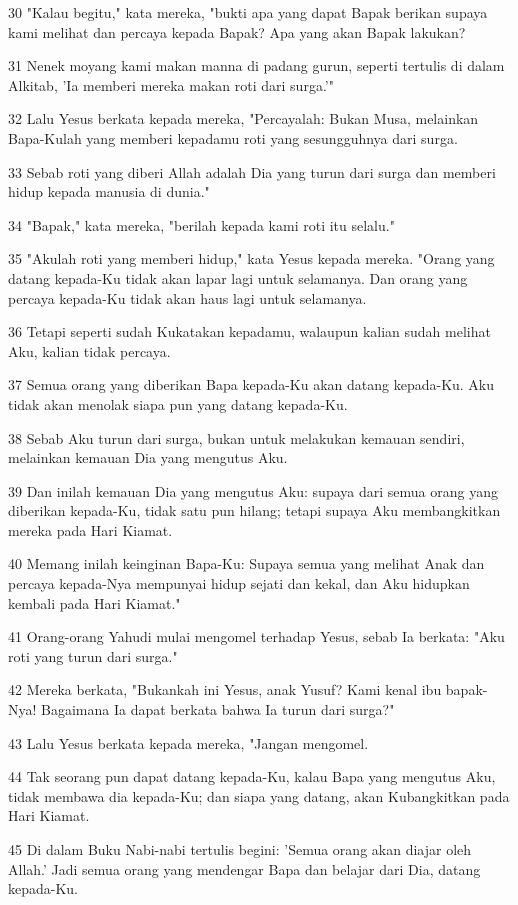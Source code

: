 \par 30 "Kalau begitu," kata mereka, "bukti apa yang dapat Bapak berikan supaya kami melihat dan percaya kepada Bapak? Apa yang akan Bapak lakukan?
\par 31 Nenek moyang kami makan manna di padang gurun, seperti tertulis di dalam Alkitab, 'Ia memberi mereka makan roti dari surga.'"
\par 32 Lalu Yesus berkata kepada mereka, "Percayalah: Bukan Musa, melainkan Bapa-Kulah yang memberi kepadamu roti yang sesungguhnya dari surga.
\par 33 Sebab roti yang diberi Allah adalah Dia yang turun dari surga dan memberi hidup kepada manusia di dunia."
\par 34 "Bapak," kata mereka, "berilah kepada kami roti itu selalu."
\par 35 "Akulah roti yang memberi hidup," kata Yesus kepada mereka. "Orang yang datang kepada-Ku tidak akan lapar lagi untuk selamanya. Dan orang yang percaya kepada-Ku tidak akan haus lagi untuk selamanya.
\par 36 Tetapi seperti sudah Kukatakan kepadamu, walaupun kalian sudah melihat Aku, kalian tidak percaya.
\par 37 Semua orang yang diberikan Bapa kepada-Ku akan datang kepada-Ku. Aku tidak akan menolak siapa pun yang datang kepada-Ku.
\par 38 Sebab Aku turun dari surga, bukan untuk melakukan kemauan sendiri, melainkan kemauan Dia yang mengutus Aku.
\par 39 Dan inilah kemauan Dia yang mengutus Aku: supaya dari semua orang yang diberikan kepada-Ku, tidak satu pun hilang; tetapi supaya Aku membangkitkan mereka pada Hari Kiamat.
\par 40 Memang inilah keinginan Bapa-Ku: Supaya semua yang melihat Anak dan percaya kepada-Nya mempunyai hidup sejati dan kekal, dan Aku hidupkan kembali pada Hari Kiamat."
\par 41 Orang-orang Yahudi mulai mengomel terhadap Yesus, sebab Ia berkata: "Aku roti yang turun dari surga."
\par 42 Mereka berkata, "Bukankah ini Yesus, anak Yusuf? Kami kenal ibu bapak-Nya! Bagaimana Ia dapat berkata bahwa Ia turun dari surga?"
\par 43 Lalu Yesus berkata kepada mereka, "Jangan mengomel.
\par 44 Tak seorang pun dapat datang kepada-Ku, kalau Bapa yang mengutus Aku, tidak membawa dia kepada-Ku; dan siapa yang datang, akan Kubangkitkan pada Hari Kiamat.
\par 45 Di dalam Buku Nabi-nabi tertulis begini: 'Semua orang akan diajar oleh Allah.' Jadi semua orang yang mendengar Bapa dan belajar dari Dia, datang kepada-Ku.
